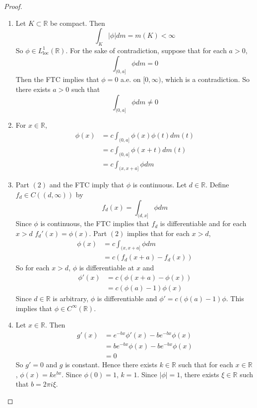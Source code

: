 \documentclass[12pt]{amsart}
\theoremstyle{definition}
\newcommand{\R}{\mathbb{R}}
\newcommand{\Rg}{[0,\infty)}
\newcommand{\loc}{\text{loc}}
\begin{document}
	\begin{proof}\
		\begin{enumerate}
			\item Let $K \subset \R$ be compact. Then $$\int_K |\phi| dm = m(K) < \infty$$ So $\phi \in L^1_{\loc}(\R)$. For the sake of contradiction, suppose that for each $a >0$, $$\int_{(0,a]}\phi dm = 0$$ 
			Then the FTC implies that $\phi = 0$ a.e. on $\Rg$, which is a contradiction. So there exists $a > 0$ such that $$\int_{(0,a]}\phi dm \neq 0$$
			\item For $x \in \R$, 
			\begin{align*}
				\phi(x) 
				&= c \int_{(0,a]} \phi(x)\phi(t) dm(t) \\
				&= c \int_{(0,a]} \phi(x+t) dm(t) \\
				&= c \int_{(x,x+a]} \phi dm 
			\end{align*}
			\item Part $(2)$ and the FTC imply that $\phi$ is continuous. Let $d \in \R$. Define $f_d \in C((d, \infty))$ by $$f_d(x) = \int_{(d, x]} \phi dm$$ 
			Since $\phi$ is continuous, the FTC implies that $f_d$ is differentiable and for each $x >d$ $f_d'(x) = \phi(x)$. Part $(2)$ implies that for each $x > d$,
			\begin{align*}
				\phi(x) 
				&= c \int_{(x,x+a]} \phi dm \\
				&= c(f_d(x+a) - f_d(x))
			\end{align*}
			So for each $x > d$, $\phi$ is differentiable at $x$ and 
			\begin{align*}
				\phi'(x) 
				&= c(\phi(x+a) - \phi(x)) \\
				&= c(\phi(a) - 1) \phi(x)
			\end{align*}	 
			Since $d \in \R$ is arbitrary, $\phi$ is differentiable and $\phi' = c(\phi(a) - 1) \phi$. This implies that $\phi \in C^{\infty}(\R)$.
			\item Let $x \in \R$. Then 
			\begin{align*}
				g'(x) 
				&= e^{-bx}\phi'(x) - be^{-bx}\phi(x) \\
				&= be^{-bx} \phi(x) - be^{-bx}\phi(x) \\
				&= 0
			\end{align*}
			So $g' = 0$ and $g$ is constant. Hence there exists $k \in \R$ such that for each $x \in \R$, $\phi(x) = ke^{bx}$. Since $\phi(0) = 1$, $k = 1$. Since $|\phi| = 1$, there exists $\xi \in \R$ such that $b = 2 \pi i \xi$. 
		\end{enumerate}
	\end{proof}
	
\end{document}
